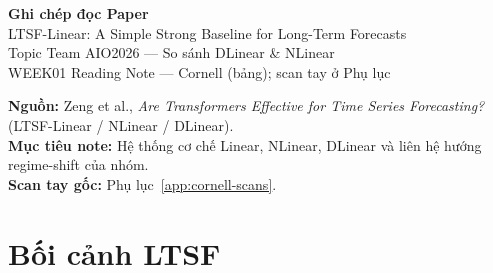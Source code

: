 \documentclass[12pt,a4paper]{article}
\begin{document}
\begin{center}
  {\LARGE\bfseries Ghi chép đọc Paper}\\[0.35em]
  {\large LTSF-Linear: A Simple Strong Baseline for Long-Term Forecasts}\\[0.5em]
  {\normalsize Topic Team AIO2026 --- So sánh DLinear \& NLinear}\\[0.25em]
  {\small WEEK01 Reading Note --- Cornell (bảng); scan tay ở Phụ lục}
\end{center}

\vspace{0.5em}
\noindent\textbf{Nguồn:} Zeng et al., \textit{Are Transformers Effective for Time Series Forecasting?}
(LTSF-Linear / NLinear / DLinear).\\
\noindent\textbf{Mục tiêu note:} Hệ thống cơ chế Linear, NLinear, DLinear và liên hệ hướng regime-shift của nhóm.\\
\noindent\textbf{Scan tay gốc:} Phụ lục~\ref{app:cornell-scans}.

\section{Bối cảnh LTSF}
\end{document}
